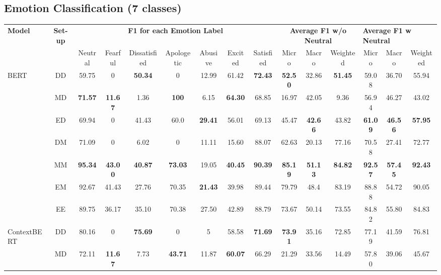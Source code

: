 \documentclass[10pt, a4paper]{article}
\begin{document}
\subsection{Emotion Classification (7 classes)}
\label{sec:emotion-classification-results}
\begin{table}[ht!]
\centering
\scriptsize
\setlength\tabcolsep{3pt}


\begin{tabular}{l|c|ccccccc|ccc|ccc}
\toprule[1pt]
\multirow{2}{*}{\textbf{Model}} & \multicolumn{1}{c|}{\multirow{2}{*}{\textbf{Set-up}}} & \multicolumn{7}{c|}{\textbf{F1 for each Emotion Label}} & \multicolumn{3}{c|}{\textbf{Average F1 w/o Neutral}} & \multicolumn{3}{l}{\textbf{Average F1 w Neutral}} \\
 &  & Neutral & Fearful & Dissatisfied & Apologetic & Abusive & Excited & Satisfied & Micro & Macro & Weighted & Micro & Macro & Weighted \\ \hline
\multirow{7}{*}{BERT} & DD & 59.75 & 0 & \textbf{50.34} & 0 & 12.99 & 61.42 & \textbf{72.43} & \textbf{52.50} & 32.86 & \textbf{51.45} & 59.08 & 36.70 & 55.94 \\
 & MD & \textbf{71.57} & \textbf{11.67} & 1.36 & \textbf{100} & 6.15 & \textbf{64.30} & 68.85 & 16.97 & 42.05 & 9.36 & 56.94 & 46.27 & 43.02 \\
 & ED & 69.94 & 0 & 41.43 & 60.0 & \textbf{29.41} & 56.01 & 69.13 & 45.47 & \textbf{42.66} & 43.82 & \textbf{61.09} & \textbf{46.56} & \textbf{57.95} \\ \cline{2-15}
  & DM & 71.09 & 0 & 6.02 & 0 & 11.11 & 15.60 & 88.07 & 62.63 & 20.13 & 77.16 & 70.58 & 27.41 & 72.77 \\
 & MM & \textbf{95.34} & \textbf{43.00} & \textbf{40.87} & \textbf{73.03} & 19.05 & \textbf{40.45} & \textbf{90.39} & \textbf{85.19} & \textbf{51.13} & \textbf{84.82} & \textbf{92.57} & \textbf{57.45} & \textbf{92.43} \\
 & EM & 92.67 & 41.43 & 27.76 & 70.35 & \textbf{21.43} & 39.98 & 89.44 & 79.79 & 48.4 & 83.19 & 88.88 & 54.72 & 90.05 \\ \cline{2-15}
 & EE & 89.75 & 36.17 & 35.10 & 70.38 & 27.50 & 42.89 & 88.79 & 73.67 & 50.14 & 73.55 & 84.82 & 55.80 & 84.83 \\\hline \hline
\multirow{7}{*}{ContextBERT} & DD & 80.16 & 0 & \textbf{75.69} & 0 & 5 & 58.58 & \textbf{71.69} & \textbf{73.91} & 35.16 & 72.85 & 77.19 & 41.59 & 76.81 \\
 & MD & 72.11 & \textbf{11.67} & 7.73 & \textbf{43.71} & 11.87 & \textbf{60.07} & 66.29 & 21.29 & 33.56 & 14.49 & 57.80 & 39.06 & 45.67 \\

\end{tabular}
\end{table}
\end{document}
